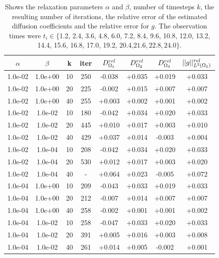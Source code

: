 \documentclass[11pt,a4paper]{article}
\begin{document}
\begin{table}
\centering
\caption{ Shows the relaxation parameters $\alpha$ and $\beta$, number of timesteps $k$, the resulting number of iterations, the relative error of the estimated diffusion coefficients and the relative error for $g$. The observation times were $t_i \in \lbrace $1.2, 2.4, 3.6, 4.8, 6.0, 7.2, 8.4, 9.6, 10.8, 12.0, 13.2, 14.4, 15.6, 16.8, 17.0, 19.2, 20.4,$ 21.6, 22.8, 24.0\rbrace $.}
\begin{tabular}{*{8}c}
$\alpha$ & $\beta$ & k & iter & $ D_{\Omega_1}\sp{rel}$ & $ D_{\Omega_2}\sp{rel}$ & $D_{\Omega_3}\sp{rel} $ & $|| g ||\sp{rel}_{L\sp{2}(\Omega_1)} $ \\
\hline

 1.0e-02 	 & 1.0e+00 	 & 10 & 250 	 & -0.038 & +0.035 & +0.019 & +0.033 \\ 
 1.0e-02 	 & 1.0e+00 	 & 20 & 225 	 & -0.002 & +0.015 & +0.007 & +0.007 \\ 
 1.0e-02 	 & 1.0e+00 	 & 40 & 255 	 & +0.003 & +0.002 & +0.001 & +0.002 \\ 

 1.0e-02 	 & 1.0e-02 	 & 10 & 180 	 & -0.042 & +0.034 & +0.020 & +0.033 \\ 
 1.0e-02 	 & 1.0e-02 	 & 20 & 445 	 & +0.010 & +0.017 & +0.003 & +0.010 \\ 
  1.0e-02 	 & 1.0e-02 	 & 40 & 429 	 & +0.037 & +0.014 & -0.003 & +0.004 \\ 
  
 1.0e-02 	 & 1.0e-04 	 & 10 & 208 	 & -0.042 & +0.034 & +0.020 & +0.033 \\ 
  1.0e-02 	 & 1.0e-04 	 & 20 & 530 	 & +0.012 & +0.017 & +0.003 & +0.020 \\ 
 1.0e-02 	 & 1.0e-04 	 & 40 & - 	 & +0.064 & +0.023 & -0.005 & +0.072 \\ 
 
 1.0e-04 	 & 1.0e+00 	 & 10 & 209 	 & -0.043 & +0.033 & +0.019 & +0.033 \\ 
 1.0e-04 	 & 1.0e+00 	 & 20 & 212 	 & -0.007 & +0.014 & +0.007 & +0.007 \\ 
 1.0e-04 	 & 1.0e+00 	 & 40 & 258 	 & -0.002 & +0.001 & +0.001 & +0.002 \\ 
 
 1.0e-04 	 & 1.0e-02 	 & 10 & 258 	 & -0.047 & +0.033 & +0.020 & +0.033 \\ 
 1.0e-04 	 & 1.0e-02 	 & 20 & 391 	 & +0.005 & +0.016 & +0.003 & +0.008 \\ 
 1.0e-04 	 & 1.0e-02 	 & 40 & 261 	 & +0.014 & +0.005 & -0.002 & +0.001 \\ 
 

\end{tabular}
\end{table}
\end{document}
